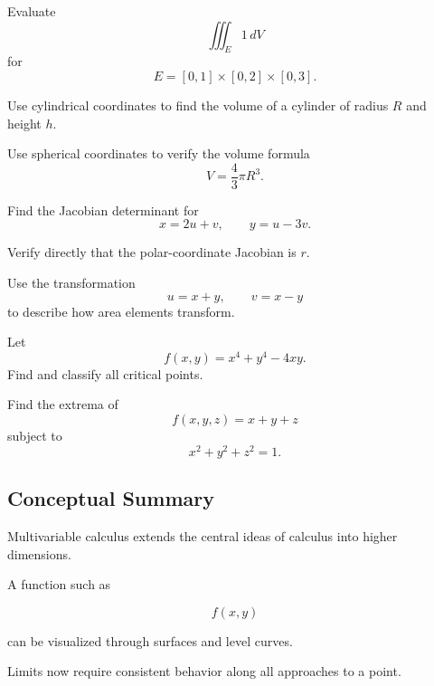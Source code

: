\begin{exercise}[2]
Evaluate
\[ \iiint_E1\,dV \]
for
\[ E=[0,1]\times[0,2]\times[0,3]. \]
\end{exercise}

\begin{exercise}[2]
Use cylindrical coordinates to find the volume of a cylinder of radius
\(R\) and height \(h\).
\end{exercise}

\begin{exercise}[2]
Use spherical coordinates to verify the volume formula
\[ V=\frac43\pi R^3. \]
\end{exercise}

\begin{exercise}[2]
Find the Jacobian determinant for
\[ x=2u+v,\qquad y=u-3v. \]
\end{exercise}

\begin{exercise}[2]
Verify directly that the polar-coordinate Jacobian is \(r\).
\end{exercise}

\begin{exercise}[3]
Use the transformation
\[ u=x+y,\qquad v=x-y \]
to describe how area elements transform.
\end{exercise}

\begin{exercise}[3]
Let
\[ f(x,y)=x^4+y^4-4xy. \]
Find and classify all critical points.
\end{exercise}

\begin{exercise}[3]
Find the extrema of
\[ f(x,y,z)=x+y+z \]
subject to
\[ x^2+y^2+z^2=1. \]
\end{exercise}

\subsection{Conceptual Summary}
\label{subsec:multivariable-summary}

Multivariable calculus extends the central ideas of calculus into higher
dimensions.

A function such as

\[ f(x,y) \]

can be visualized through surfaces and level curves.

Limits now require consistent behavior along all approaches to a point.

